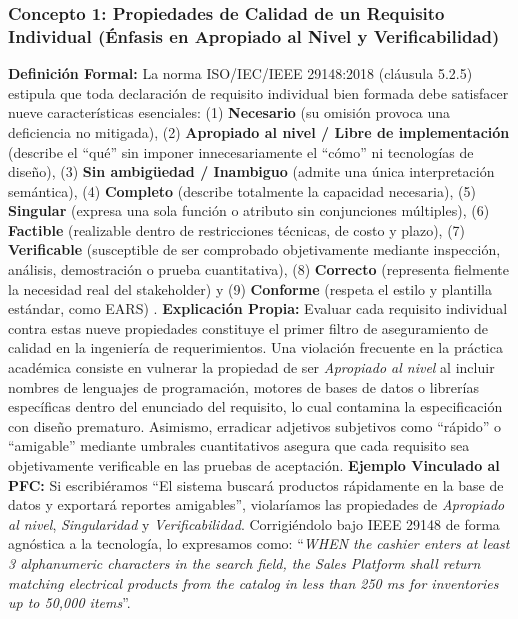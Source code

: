 \documentclass[conference,10pt]{IEEEtran}
\begin{document}
	\subsubsection{Concepto 1: Propiedades de Calidad de un Requisito Individual (Énfasis en Apropiado al Nivel y Verificabilidad)}
	\textbf{Definición Formal:} La norma ISO/IEC/IEEE 29148:2018 (cláusula 5.2.5) estipula que toda declaración de requisito individual bien formada debe satisfacer nueve características esenciales: (1) \textbf{Necesario} (su omisión provoca una deficiencia no mitigada), (2) \textbf{Apropiado al nivel / Libre de implementación} (describe el ``qué'' sin imponer innecesariamente el ``cómo'' ni tecnologías de diseño), (3) \textbf{Sin ambigüedad / Inambiguo} (admite una única interpretación semántica), (4) \textbf{Completo} (describe totalmente la capacidad necesaria), (5) \textbf{Singular} (expresa una sola función o atributo sin conjunciones múltiples), (6) \textbf{Factible} (realizable dentro de restricciones técnicas, de costo y plazo), (7) \textbf{Verificable} (susceptible de ser comprobado objetivamente mediante inspección, análisis, demostración o prueba cuantitativa), (8) \textbf{Correcto} (representa fielmente la necesidad real del stakeholder) y (9) \textbf{Conforme} (respeta el estilo y plantilla estándar, como EARS) \cite{ieee29148, pohl2025}.
	\textbf{Explicación Propia:} Evaluar cada requisito individual contra estas nueve propiedades constituye el primer filtro de aseguramiento de calidad en la ingeniería de requerimientos. Una violación frecuente en la práctica académica consiste en vulnerar la propiedad de ser \textit{Apropiado al nivel} al incluir nombres de lenguajes de programación, motores de bases de datos o librerías específicas dentro del enunciado del requisito, lo cual contamina la especificación con diseño prematuro. Asimismo, erradicar adjetivos subjetivos como ``rápido'' o ``amigable'' mediante umbrales cuantitativos asegura que cada requisito sea objetivamente verificable en las pruebas de aceptación.
	\textbf{Ejemplo Vinculado al PFC:} Si escribiéramos ``El sistema buscará productos rápidamente en la base de datos y exportará reportes amigables'', violaríamos las propiedades de \textit{Apropiado al nivel}, \textit{Singularidad} y \textit{Verificabilidad}. Corrigiéndolo bajo IEEE 29148 de forma agnóstica a la tecnología, lo expresamos como: ``\textit{WHEN the cashier enters at least 3 alphanumeric characters in the search field, the Sales Platform shall return matching electrical products from the catalog in less than 250 ms for inventories up to 50,000 items}''.
\end{document}
